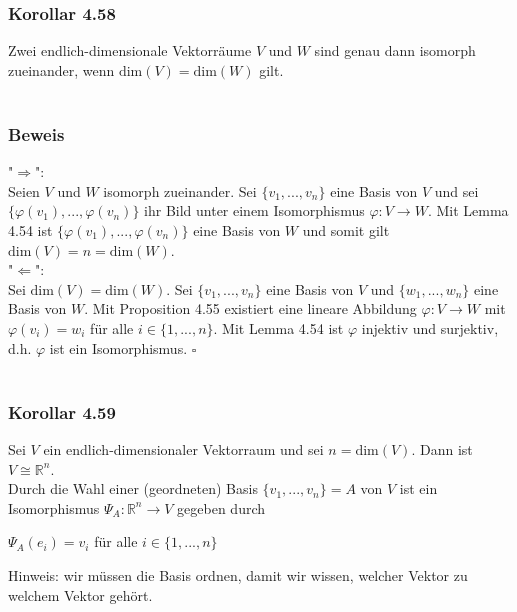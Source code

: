 \documentclass{article}
\begin{document}
\subsubsection*{Korollar 4.58}
Zwei endlich-dimensionale Vektorräume $V$ und $W$ sind genau dann isomorph zueinander, wenn $\text{dim}(V) = \text{dim}(W)$ gilt. \\
\\
\subsubsection*{Beweis}
"$\Rightarrow$": \\
Seien $V$ und $W$ isomorph zueinander. Sei $\{v_1,...,v_n\}$ eine Basis von $V$ und sei $\{\varphi(v_1),...,\varphi(v_n)\}$ ihr Bild unter einem Isomorphismus $\varphi: V \rightarrow W$.
Mit Lemma 4.54 ist $\{\varphi(v_1),...,\varphi(v_n)\}$ eine Basis von $W$ und somit gilt $\text{dim}(V) = n = \text{dim}(W)$. \\
"$\Leftarrow$": \\
Sei $\text{dim}(V) = \text{dim}(W)$. Sei $\{v_1,...,v_n\}$ eine Basis von $V$ und $\{w_1,...,w_n\}$ eine Basis von $W$. Mit Proposition 4.55 existiert eine lineare Abbildung $\varphi: V \rightarrow W$ mit $\varphi(v_i) = w_i$ für alle $i \in \{1,...,n\}$.
Mit Lemma 4.54 ist $\varphi$ injektiv und surjektiv, d.h. $\varphi$ ist ein Isomorphismus. $\square$ \\
\\
\subsubsection*{Korollar 4.59}
Sei $V$ ein endlich-dimensionaler Vektorraum und sei $n=\text{dim}(V)$. Dann ist $V \cong \mathbb{R}^n$. \\
Durch die Wahl einer (geordneten) Basis $\{v_1,...,v_n\} = A$ von $V$ ist ein Isomorphismus $\varPsi_A: \mathbb{R}^n \rightarrow V$ gegeben durch \\
\begin{center}
    $\varPsi_A(e_i) = v_i$ für alle $i \in \{1,...,n\}$ \\
\end{center}
Hinweis: wir müssen die Basis ordnen, damit wir wissen, welcher Vektor zu welchem Vektor gehört. \\
\\
\end{document}
